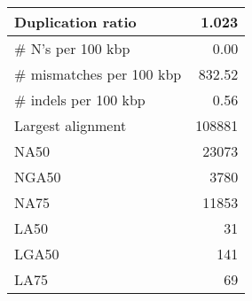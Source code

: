\documentclass[12pt,a4paper]{article}
\begin{document}
\begin{table}[ht]
\begin{center}
\begin{tabular}{|l*{1}{|r}|}
Duplication ratio & 1.023 \\ \hline
\# N's per 100 kbp & 0.00 \\ \hline
\# mismatches per 100 kbp & 832.52 \\ \hline
\# indels per 100 kbp & 0.56 \\ \hline
Largest alignment & 108881 \\ \hline
NA50 & 23073 \\ \hline
NGA50 & 3780 \\ \hline
NA75 & 11853 \\ \hline
LA50 & 31 \\ \hline
LGA50 & 141 \\ \hline
LA75 & 69 \\ \hline
\end{tabular}
\end{center}
\end{table}
\end{document}
